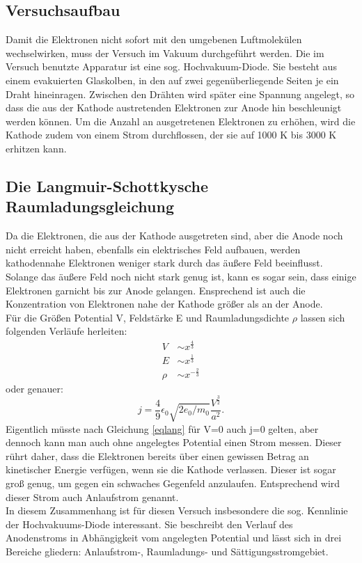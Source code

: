 \subsection{Versuchsaufbau}
Damit die Elektronen nicht sofort mit den umgebenen Luftmolekülen wechselwirken, muss der Versuch im Vakuum durchgeführt werden. Die im Versuch benutzte Apparatur ist eine sog. Hochvakuum-Diode. Sie besteht aus einem evakuierten Glaskolben, in den auf zwei gegenüberliegende Seiten je ein Draht hineinragen. Zwischen den Drähten wird später eine Spannung angelegt, so dass die aus der Kathode austretenden Elektronen zur Anode hin beschleunigt werden können. Um die Anzahl an ausgetretenen Elektronen zu erhöhen, wird die Kathode zudem von einem Strom durchflossen, der sie auf 1000 K bis 3000 K erhitzen kann. 

\subsection{ Die Langmuir-Schottkysche Raumladungsgleichung}
Da die Elektronen, die aus der Kathode ausgetreten sind, aber die Anode noch nicht erreicht haben, ebenfalls ein elektrisches Feld aufbauen, werden kathodennahe Elektronen weniger stark durch das äußere Feld beeinflusst. Solange das äußere Feld noch nicht stark genug ist, kann es sogar sein, dass einige Elektronen garnicht bis zur Anode gelangen. Ensprechend ist auch die Konzentration von Elektronen nahe der Kathode größer als an der Anode.\\
Für die Größen Potential V, Feldstärke E und Raumladungsdichte $\rho$ lassen sich folgenden Verläufe herleiten:
\begin{align*}
V  &\sim x^\frac{4}{3}\\
E  &\sim x^\frac{1}{3}\\
\rho  &\sim x^{-\frac{2}{3}}
\end{align*}
oder genauer:
\begin{equation}
j=\frac{4}{9}\epsilon_0 \sqrt{2e_0/m_0} \frac{V^\frac{3}{2}}{a^2}.
\label{eqlang}
\end{equation}
Eigentlich müsste nach Gleichung \eqref{eqlang} für V=0 auch j=0 gelten, aber dennoch kann man auch ohne angelegtes Potential einen Strom messen. Dieser rührt daher, dass  die Elektronen bereits über einen gewissen Betrag an kinetischer Energie verfügen, wenn sie die Kathode verlassen. Dieser ist sogar groß genug, um gegen ein schwaches Gegenfeld anzulaufen. Entsprechend wird dieser Strom auch Anlaufstrom genannt.\\
In diesem Zusammenhang ist für diesen Versuch insbesondere die sog. Kennlinie der Hochvakuums-Diode interessant. Sie beschreibt den Verlauf des Anodenstroms in Abhängigkeit vom angelegten Potential und lässt sich in drei Bereiche gliedern:  Anlaufstrom-, Raumladungs- und Sättigungsstromgebiet.



